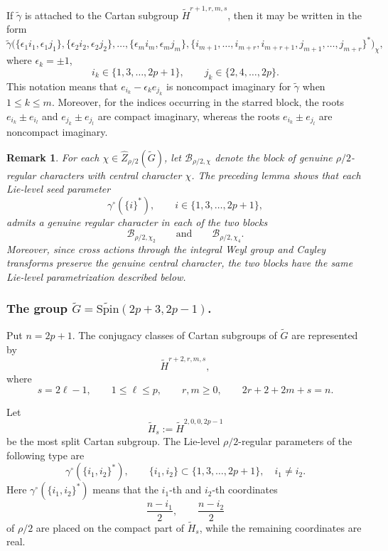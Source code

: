 \documentclass{amsart}
\newcommand{\Spin}{{\mathrm{Spin}}}
\newtheorem{remark}[thm]{Remark}
\theoremstyle{definition}
\begin{document}
If \(\widetilde\gamma\) is attached to the Cartan subgroup
\(\widetilde H^{r+1,r,m,s}\), then it may be written in the form
\[
\widetilde\gamma\bigl(
\{\epsilon_1 i_1,\epsilon_1 j_1\},
\{\epsilon_2 i_2,\epsilon_2 j_2\},
\ldots,
\{\epsilon_m i_m,\epsilon_m j_m\},
\{i_{m+1},\ldots,i_{m+r},i_{m+r+1},
j_{m+1},\ldots,j_{m+r}\}^*
\bigr)_\chi,
\]
where \(\epsilon_k=\pm1\),
\[
i_k\in\{1,3,\ldots,2p+1\},
\qquad
j_k\in\{2,4,\ldots,2p\}.
\]
This notation means that
$e_{i_k}-\epsilon_k e_{j_k}$
is noncompact imaginary for \(\widetilde\gamma\) when
\(1\leq k\leq m\). Moreover, for the indices occurring in the starred
block, the roots
$e_{i_k}\pm e_{i_l}$
and $e_{j_k}\pm e_{j_l}$
are compact imaginary, whereas the roots
$e_{i_k}\pm e_{j_l}$
are noncompact imaginary.

\begin{remark}
For each
\(\chi\in\widehat Z_{\rho/2}(\widetilde G)\), let
\(\mathcal B_{\rho/2,\chi}\) denote the block of genuine
\(\rho/2\)-regular characters with central character \(\chi\).
The preceding lemma shows that each Lie-level seed parameter
\[
\gamma^\circ(\{i\}^*),
\qquad
i\in\{1,3,\ldots,2p+1\},
\]
admits a genuine regular character in each of the two blocks
\[
\mathcal B_{\rho/2,\chi_2}
\qquad\text{and}\qquad
\mathcal B_{\rho/2,\chi_4}.
\]
Moreover, since cross actions through the integral Weyl group and Cayley transforms preserve the
genuine central character, the two blocks have the same
Lie-level parametrization described below.
\end{remark}


\subsubsection{The group
\(\widetilde G=\widetilde{\Spin}(2p+3,2p-1)\).}

Put \(n=2p+1\). The conjugacy classes of Cartan subgroups of
\(\widetilde G\) are represented by
\[
\widetilde H^{r+2,r,m,s},
\]
where
\[
s=2\ell-1,\qquad 1\leq\ell\leq p,
\qquad r,m\geq0,
\qquad
2r+2+2m+s=n.
\]

Let
\[
\widetilde H_s:=\widetilde H^{2,0,0,2p-1}
\]
be the most split Cartan subgroup. The Lie-level
\(\rho/2\)-regular parameters of the following type are
\[
\gamma^\circ(\{i_1,i_2\}^*),
\qquad
\{i_1,i_2\}\subset\{1,3,\ldots,2p+1\},
\quad i_1\neq i_2.
\]
Here \(\gamma^\circ(\{i_1,i_2\}^*)\) means that the
\(i_1\)-th and \(i_2\)-th coordinates
\[
\frac{n-i_1}{2},\qquad \frac{n-i_2}{2}
\]
of \(\rho/2\) are placed on the compact part of
\(\widetilde H_s\), while the remaining coordinates are real.
\end{document}
